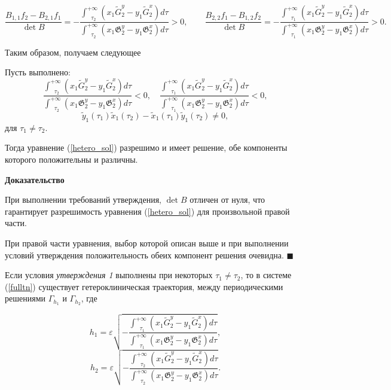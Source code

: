 \begin{equation*}
\frac{B_{1,1}f_2 - B_{2,1}f_1}{\det B} = 
- \frac{\int_{\text{ } \tau_2}^{+\infty} \left( x_1 \tilde{G}_2^y - y_1 \tilde{G}_2^x \right) d \tau}{\int_{\text{ } \tau_2}^{+\infty} \left( x_1 \mathfrak{G}_2^y - y_1 \mathfrak{G}_2^x \right) d \tau}  > 0, \qquad
\frac{B_{2,2}f_1 - B_{1,2}f_2}{\det B} = 
- \frac{\int_{\text{ } \tau_1}^{+\infty} \left( x_1 \tilde{G}_2^y - y_1 \tilde{G}_2^x \right) d \tau}{\int_{\text{ } \tau_1}^{+\infty} \left( x_1 \mathfrak{G}_2^y - y_1 \mathfrak{G}_2^x \right) d \tau}  > 0.
\end{equation*}

Таким образом, получаем следующее
\begin{utv}
Пусть выполнено:
\begin{equation} 
\frac{\int_{\text{ } \tau_2}^{+\infty} \left( x_1 \tilde{G}_2^y - y_1 \tilde{G}_2^x \right) d \tau}{\int_{\text{ } \tau_2}^{+\infty} \left( x_1 \mathfrak{G}_2^y - y_1 \mathfrak{G}_2^x \right) d \tau}  < 0, \quad \frac{\int_{\text{ } \tau_1}^{+\infty} \left( x_1 \tilde{G}_2^y - y_1 \tilde{G}_2^x \right) d \tau}{\int_{\text{ } \tau_1}^{+\infty} \left( x_1 \mathfrak{G}_2^y - y_1 \mathfrak{G}_2^x \right) d \tau}  < 0,
\label{integrals}
\end{equation}
$$\tilde y_1(\tau_1) \tilde x_1(\tau_2) - \tilde x_1(\tau_1) \tilde y_1(\tau_2) \neq 0,$$
для $\tau_1 \neq \tau_2$.

Тогда уравнение (\ref{hetero_sol}) разрешимо и имеет решение, обе компоненты которого положительны и различны.

\end{utv}

\textbf{Доказательство}

При выполнении требований утверждения, $\det B$ отличен от нуля, что гарантирует разрешимость уравнения (\ref{hetero_sol}) для произвольной правой части.


При правой части уравнения, выбор которой описан выше и при выполнении условий утверждения положительность обеих компонент решения очевидна. $\blacksquare$

\begin{consequence}
Если условия \textit{утверждения 1} выполнены при некоторых $\tau_1 \neq \tau_2$, то в системе (\ref{fulltn}) существует гетероклиническая траектория, между периодическими решениями $\Gamma_{h_1}$ и $\Gamma_{h_2}$, где

$$h_1 = \varepsilon \sqrt{- \frac{\int_{\text{ } \tau_1}^{+\infty} \left( x_1 \tilde{G}_2^y - y_1 \tilde{G}_2^x \right) d \tau}{\int_{\text{ } \tau_1}^{+\infty} \left( x_1 \mathfrak{G}_2^y - y_1 \mathfrak{G}_2^x \right) d \tau}},$$
$$h_2 = \varepsilon \sqrt{- \frac{\int_{\text{ } \tau_2}^{+\infty} \left( x_1 \tilde{G}_2^y - y_1 \tilde{G}_2^x \right) d \tau}{\int_{\text{ } \tau_2}^{+\infty} \left( x_1 \mathfrak{G}_2^y - y_1 \mathfrak{G}_2^x \right) d \tau}}.$$
\end{consequence}


